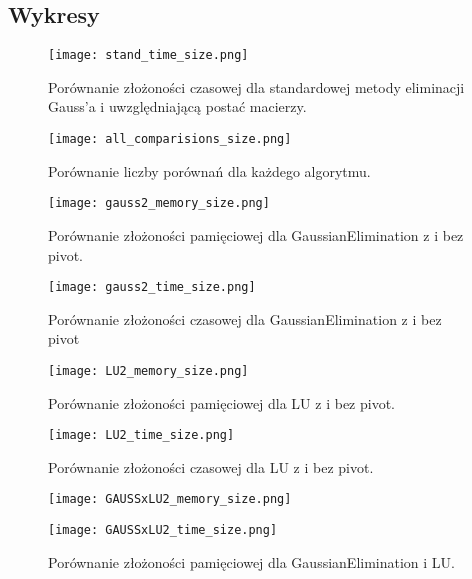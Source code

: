\documentclass[11pt]{article}
\begin{document}
\begin{flushleft}
\subsection{Wykresy}
\centering
\begin{figure}[H]
  \begin{minipage}[b]{.45\textwidth}
    \centering
    \texttt{[image: stand\_time\_size.png]}
    \caption{Porównanie złożoności czasowej dla standardowej metody eliminacji Gauss'a i uwzględniającą postać macierzy.}
  \end{minipage}
    \begin{minipage}[b]{.45\textwidth}
    \centering
    \texttt{[image: all\_comparisions\_size.png]}
    \caption{Porównanie liczby porównań dla każdego algorytmu.}
  \end{minipage}
  \begin{minipage}[b]{.45\textwidth}
    \centering
    \texttt{[image: gauss2\_memory\_size.png]}
    \caption{Porównanie złożoności pamięciowej dla GaussianElimination z i bez pivot.}
  \end{minipage}\hfill
  \begin{minipage}[b]{.45\textwidth}
    \centering
    \texttt{[image: gauss2\_time\_size.png]}
    \caption{Porównanie złożoności czasowej dla GaussianElimination z i bez pivot}
  \end{minipage}
  \begin{minipage}[b]{.45\textwidth}
    \centering
    \texttt{[image: LU2\_memory\_size.png]}
    \caption{Porównanie złożoności pamięciowej dla  LU z i bez pivot.}
  \end{minipage}\hfill
  \begin{minipage}[b]{.45\textwidth}
    \centering
    \texttt{[image: LU2\_time\_size.png]}
    \caption{Porównanie złożoności czasowej dla  LU z i bez pivot.}
  \end{minipage}
  \end{figure}
\begin{figure}[H]
  \begin{minipage}[b]{.45\textwidth}
    \centering
    \texttt{[image: GAUSSxLU2\_memory\_size.png]}
    \caption{Porównanie złożoności pamięciowej dla GaussianElimination i LU.}
  \end{minipage}\hfill
  \begin{minipage}[b]{.45\textwidth}
    \centering
    \texttt{[image: GAUSSxLU2\_time\_size.png]}

\end{minipage}
\end{figure}
\end{flushleft}
\end{document}

